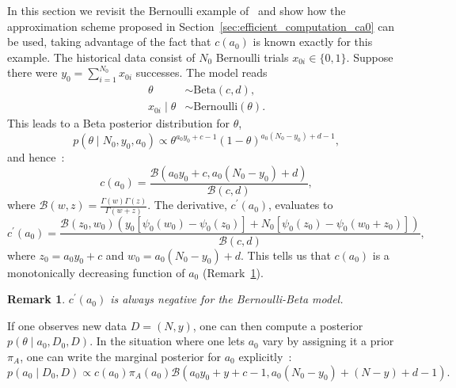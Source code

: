 \documentclass[a4paper, notitlepage, 11pt]{article}
\newtheorem{remark}{Remark}[]
\begin{document}
In this section we revisit the Bernoulli example of~\cite{Neuenschwander2009} and show how the approximation scheme proposed in Section~\ref{sec:efficient_computation_ca0} can be used, taking advantage of the fact that $c(a_0)$ is known exactly for this example.
The historical data consist of $N_0$ Bernoulli trials $x_{0i} \in \{0,1\}$.
Suppose there were $y_0 = \sum_{i=1}^{N_0}x_{0i}$ successes.
The model reads
\begin{align*}
 \theta &\sim \text{Beta}(c, d), \\
 x_{0i} \mid \theta &\sim \text{Bernoulli}(\theta).
\end{align*}
This leads to a Beta posterior distribution for $\theta$,
\begin{equation}
 \label{eq:bernoulli_posterior}
 p(\theta \mid N_0, y_0, a_0) \propto \theta ^{a_0 y_0 + c - 1} (1-\theta)^{a_0 (N_0 -y_0) + d - 1},
\end{equation}
and hence~\citep{Neuenschwander2009}:
\begin{equation}
 \label{eq:cA0_bernoulli}
 c(a_0) = \frac{\mathcal{B}(a_0 y_0 + c, a_0 (N_0 -y_0) + d)}{\mathcal{B}(c, d)},
\end{equation}
where $\mathcal{B}(w, z) = \frac{\Gamma(w)\Gamma(z)}{\Gamma(w + z)}$.
The derivative, $c^\prime(a_0)$, evaluates to
\begin{equation}
  \label{eq:cA0_prime_bernoulli}
c^\prime(a_0) = \frac{\mathcal{B}(z_0, w_0) \left(y_0 \left[\psi_0(w_0) - \psi_0(z_0) \right] + N_0 \left[ \psi_0(z_0) - \psi_0(w_0 + z_0) \right] \right) }{\mathcal{B}(c, d)},
\end{equation}
where $z_0 = a_0 y_0 + c $ and $w_0 = a_0 (N_0 -y_0) + d$.
This tells us that $c(a_0)$ is a monotonically decreasing function of $a_0$ (Remark~\ref{rmk:Bernoulli_cA0_prime}).
\begin{remark}
\label{rmk:Bernoulli_cA0_prime}
 $c^\prime(a_0)$ is always negative for the Bernoulli-Beta model.
\end{remark}

If one observes new data $D = (N, y) $, one can then compute a posterior $p(\theta \mid a_0, D_0, D)$.
In the situation where one lets $a_0$ vary by assigning it a prior $\pi_A$, one can write the marginal posterior for $a_0$ explicitly~\cite[Eq. 8]{Neuenschwander2009}:
\begin{equation}
 \label{eq:marginal_posterior_a0}
 p(a_0 \mid D_0, D) \propto c(a_0) \pi_A(a_0) \mathcal{B}(a_0 y_0 + y  + c -1, a_0(N_0-y_0) + (N -y) + d -1 ).
\end{equation}
\end{document}

